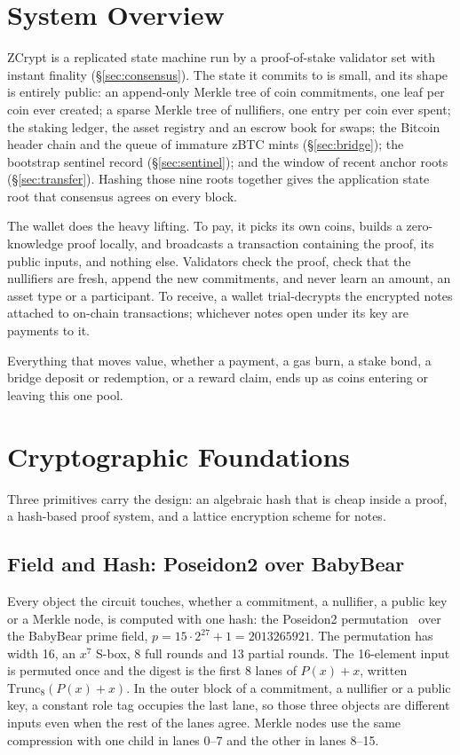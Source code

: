 \documentclass[twocolumn,10pt]{article}
\begin{document}
\section{System Overview}
\label{sec:overview}

ZCrypt is a replicated state machine run by a proof-of-stake validator set with instant finality (\S\ref{sec:consensus}). The state it commits to is small, and its shape is entirely public: an append-only Merkle tree of coin commitments, one leaf per coin ever created; a sparse Merkle tree of nullifiers, one entry per coin ever spent; the staking ledger, the asset registry and an escrow book for swaps; the Bitcoin header chain and the queue of immature zBTC mints (\S\ref{sec:bridge}); the bootstrap sentinel record (\S\ref{sec:sentinel}); and the window of recent anchor roots (\S\ref{sec:transfer}). Hashing those nine roots together gives the application state root that consensus agrees on every block.

The wallet does the heavy lifting. To pay, it picks its own coins, builds a zero-knowledge proof locally, and broadcasts a transaction containing the proof, its public inputs, and nothing else. Validators check the proof, check that the nullifiers are fresh, append the new commitments, and never learn an amount, an asset type or a participant. To receive, a wallet trial-decrypts the encrypted notes attached to on-chain transactions; whichever notes open under its key are payments to it.

Everything that moves value, whether a payment, a gas burn, a stake bond, a bridge deposit or redemption, or a reward claim, ends up as coins entering or leaving this one pool.

\section{Cryptographic Foundations}
\label{sec:crypto}

Three primitives carry the design: an algebraic hash that is cheap inside a proof, a hash-based proof system, and a lattice encryption scheme for notes.

\subsection{Field and Hash: Poseidon2 over BabyBear}
\label{sec:hash}

Every object the circuit touches, whether a commitment, a nullifier, a public key or a Merkle node, is computed with one hash: the Poseidon2 permutation~\cite{poseidon2} over the BabyBear prime field, $p = 15\cdot 2^{27}+1 = 2013265921$. The permutation has width 16, an $x^7$ S-box, 8 full rounds and 13 partial rounds. The 16-element input is permuted once and the digest is the first 8 lanes of $P(x)+x$, written $\mathrm{Trunc}_8(P(x)+x)$. In the outer block of a commitment, a nullifier or a public key, a constant role tag occupies the last lane, so those three objects are different inputs even when the rest of the lanes agree. Merkle nodes use the same compression with one child in lanes 0--7 and the other in lanes 8--15.
\end{document}
